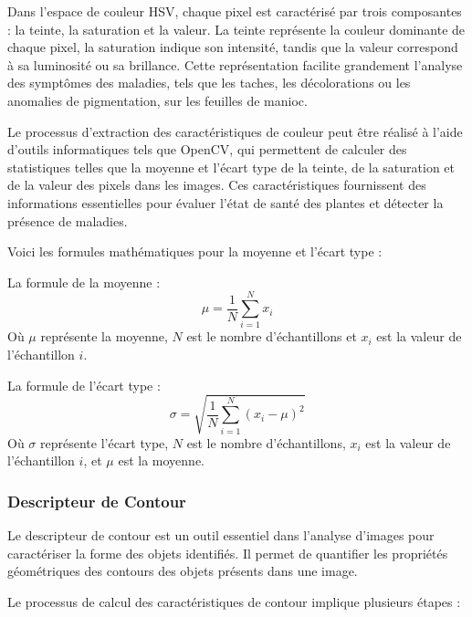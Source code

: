 \documentclass{article}
\begin{document}
	Dans l'espace de couleur HSV, chaque pixel est caractérisé par trois composantes : la teinte, la saturation et la valeur. La teinte représente la couleur dominante de chaque pixel, la saturation indique son intensité, tandis que la valeur correspond à sa luminosité ou sa brillance. Cette représentation facilite grandement l'analyse des symptômes des maladies, tels que les taches, les décolorations ou les anomalies de pigmentation, sur les feuilles de manioc.
	
	Le processus d'extraction des caractéristiques de couleur peut être réalisé à l'aide d'outils informatiques tels que OpenCV, qui permettent de calculer des statistiques telles que la moyenne et l'écart type de la teinte, de la saturation et de la valeur des pixels dans les images. Ces caractéristiques fournissent des informations essentielles pour évaluer l'état de santé des plantes et détecter la présence de maladies.
	
	Voici les formules mathématiques pour la moyenne et l'écart type : 
	
	La formule de la moyenne :
	\[
	\mu = \frac{1}{N} \sum_{i=1}^{N} x_i
	\]
	Où \( \mu \) représente la moyenne, \( N \) est le nombre d'échantillons et \( x_i \) est la valeur de l'échantillon \( i \).
	
	La formule de l'écart type :
	\[
	\sigma = \sqrt{\frac{1}{N} \sum_{i=1}^{N} (x_i - \mu)^2}
	\]
	Où \( \sigma \) représente l'écart type, \( N \) est le nombre d'échantillons, \( x_i \) est la valeur de l'échantillon \( i \), et \( \mu \) est la moyenne.
	
	\subsubsection{Descripteur de Contour}
	Le descripteur de contour est un outil essentiel dans l'analyse d'images pour caractériser la forme des objets identifiés. Il permet de quantifier les propriétés géométriques des contours des objets présents dans une image.
	
	Le processus de calcul des caractéristiques de contour implique plusieurs étapes :
	
\end{document}
